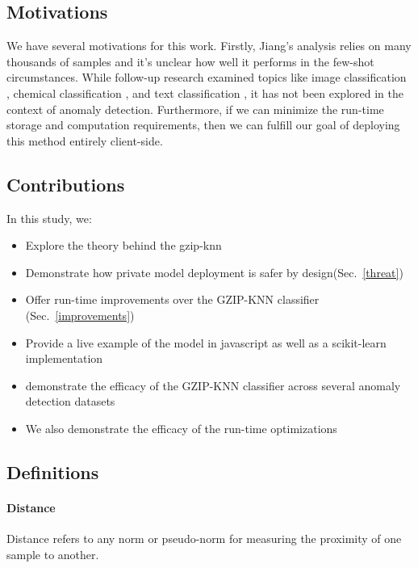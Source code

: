 \documentclass[sigconf]{acmart}
\begin{document}
\subsection{Motivations}
 We have several motivations for this work. Firstly, Jiang's analysis relies on many thousands of samples and it's unclear how well it performs in the few-shot circumstances. While follow-up research examined topics like image classification \cite{opitz2023gzip}, chemical classification \cite{weinreich2023parameter}, and text classification \cite{nishida2011tweet}, it has not been explored in the context of anomaly detection. Furthermore, if we can minimize the run-time storage and computation requirements, then we can fulfill our goal of deploying this method entirely client-side.

\subsection{Contributions}

In this study, we:

\begin{itemize}
    \item Explore the theory behind the gzip-knn 
    \item Demonstrate how private model deployment is safer by design(Sec.~\ref{threat})
    \item Offer run-time improvements over the GZIP-KNN classifier (Sec.~\ref{improvements})
    \item Provide a live example of the model in javascript as well as a scikit-learn implementation
    \item demonstrate the efficacy of the GZIP-KNN classifier across several anomaly detection datasets
    \item We also demonstrate the efficacy of the run-time optimizations
\end{itemize}

\subsection{Definitions}
\paragraph{Distance}
Distance refers to any norm or pseudo-norm for measuring the proximity of one sample to another. 
\end{document}
